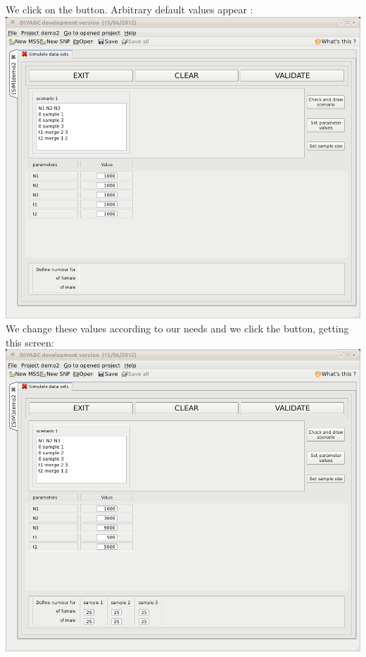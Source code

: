 We click on the  button. Arbitrary
default values appear :\\


\includegraphics[scale=0.33]{gui_pictures/Capture-DIYABC-67} \\


We change these values according to our needs and we click the  button, getting this screen:\\


\includegraphics[scale=0.33]{gui_pictures/Capture-DIYABC-68} \\


